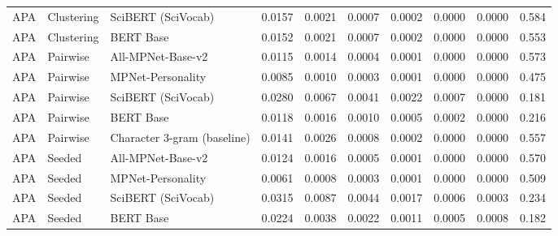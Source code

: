 \begin{table}[ht]
\begin{tabular}{lllrrrrrrr}
APA & Clustering & SciBERT (SciVocab) & 0.0157 & 0.0021 & 0.0007 & 0.0002 & 0.0000 & 0.0000 & 0.584 \\
APA & Clustering & BERT Base & 0.0152 & 0.0021 & 0.0007 & 0.0002 & 0.0000 & 0.0000 & 0.553 \\
APA & Pairwise & All-MPNet-Base-v2 & 0.0115 & 0.0014 & 0.0004 & 0.0001 & 0.0000 & 0.0000 & 0.573 \\
APA & Pairwise & MPNet-Personality & 0.0085 & 0.0010 & 0.0003 & 0.0001 & 0.0000 & 0.0000 & 0.475 \\
APA & Pairwise & SciBERT (SciVocab) & 0.0280 & 0.0067 & 0.0041 & 0.0022 & 0.0007 & 0.0000 & 0.181 \\
APA & Pairwise & BERT Base & 0.0118 & 0.0016 & 0.0010 & 0.0005 & 0.0002 & 0.0000 & 0.216 \\
APA & Pairwise & Character 3-gram (baseline) & 0.0141 & 0.0026 & 0.0008 & 0.0002 & 0.0000 & 0.0000 & 0.557 \\
APA & Seeded & All-MPNet-Base-v2 & 0.0124 & 0.0016 & 0.0005 & 0.0001 & 0.0000 & 0.0000 & 0.570 \\
APA & Seeded & MPNet-Personality & 0.0061 & 0.0008 & 0.0003 & 0.0001 & 0.0000 & 0.0000 & 0.509 \\
APA & Seeded & SciBERT (SciVocab) & 0.0315 & 0.0087 & 0.0044 & 0.0017 & 0.0006 & 0.0003 & 0.234 \\
APA & Seeded & BERT Base & 0.0224 & 0.0038 & 0.0022 & 0.0011 & 0.0005 & 0.0008 & 0.182 \\
\bottomrule
\end{tabular}
\end{table}
